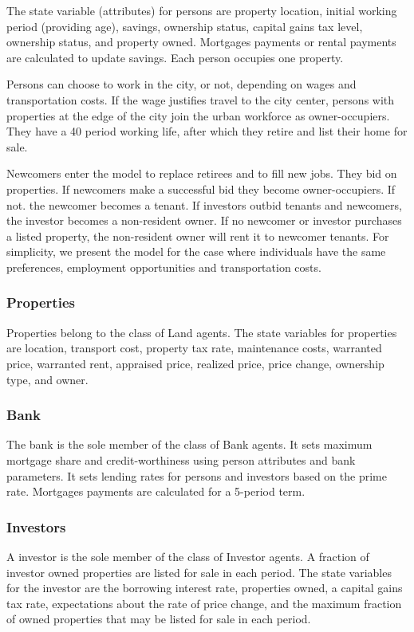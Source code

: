 The state variable (attributes) for persons are property location, initial working period (providing age), savings, ownership status, capital gains tax level, ownership status, and property owned. Mortgages payments or rental payments are calculated to update savings. Each person occupies one property. 

Persons can choose to work in the city, or not, depending on wages and transportation costs. If the wage justifies travel to the city center, persons with properties at the edge of the city join the urban workforce as owner-occupiers. They have a 40 period working life, after which they retire and list their home for sale.   

Newcomers enter the model to replace retirees and to fill new jobs. They bid on properties. %
If newcomers make a successful bid they become owner-occupiers. If not. the newcomer becomes a tenant. If investors outbid tenants and newcomers, the investor becomes a non-resident owner.  If no newcomer or investor  purchases a listed property, the non-resident owner will rent it to newcomer tenants.  %
 For simplicity, we present the model for the case where individuals have the same preferences, employment opportunities and transportation costs.

\subsubsection{Properties}
Properties belong to the class of Land agents. The state variables for properties are location, transport cost, property tax rate, maintenance costs, warranted price, warranted rent, appraised price, realized price, price change, ownership type, and owner. 

\subsubsection{Bank}
The bank is the sole member of the class of Bank agents. It sets maximum mortgage share and credit-worthiness using person attributes and bank parameters. It sets lending rates for persons and investors based on the prime rate. Mortgages payments are calculated for a 5-period term.
 
\subsubsection{Investors}
A investor is the sole member of the class of Investor agents. A fraction of investor owned properties are listed for sale in each period. The state variables for the investor are the borrowing interest rate, properties owned, a capital gains tax rate, expectations about the rate of price change, and the maximum fraction of owned properties that may be listed for sale in each period.


